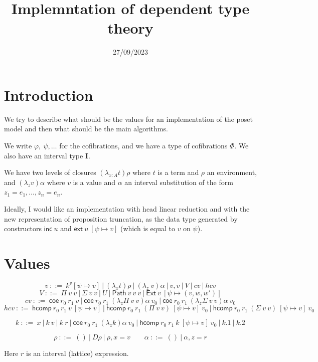 \documentclass[10pt,a4paper]{article}
\newcommand{\II}{\mathbf{I}}
\newcommand{\Path}{\mathsf{Path}}
\newcommand{\Ext}{\mathsf{Ext}}
\newcommand{\ext}{\mathsf{ext}}
\newcommand{\inc}{\mathsf{inc}}
\newcommand{\hcomp}{\mathsf{hcomp}}
\newcommand{\coe}{\mathsf{coe}}
\begin{document}
\title{Implemntation of dependent type theory}

\author{}
\date{27/09/2023}
\maketitle


\section*{Introduction}

We try to describe what should be the values for an implementation of the poset model
and then what should be the main algorithms.

We write $\varphi,~\psi,\dots$ for the cofibrations, and we have a type of cofibrations $\Phi$.
We also have an interval type $\II$.

We have two levels of closures $(\lambda_{x:A}t)\rho$ where $t$ is a term and $\rho$
an environment, and $(\lambda_zv)\alpha$ where $v$ is a value and $\alpha$ an interval
substitution of the form $z_1=e_1,\dots,z_n=e_n$.


\medskip

Ideally, I would like an implementation with head linear reduction and with the new
representation of proposition truncation, as the data type generated by constructors
$\inc~u$ and $\ext~u~[\psi\mapsto v]$ (which is equal to $v$ on $\psi$).



\section*{Values}

$$
v~::=~k^v[\psi\mapsto v]~|~(\lambda_{x}t)\rho~|~(\lambda_z~v)\alpha~|~v,v~|~V~|~cv~|~hcv$$
$$
V~::=~\Pi~v~v~|~\Sigma~v~v~|~U~|~\Path~v~v~v~|~\Ext~v~[\psi\mapsto (v,w,w')]
$$
$$
cv~::=~\coe~r_0~r_1~v~|~
       \coe~r_0~r_1~(\lambda_z\Pi~v~v)\alpha~v_0~|~\coe~r_0~r_1~(\lambda_z\Sigma~v~v)\alpha~v_0
$$
$$
       hcv~::=~\hcomp~r_0~r_1~v~[\psi\mapsto v]~|~
       \hcomp~r_0~r_1~(\Pi~v~v)~[\psi\mapsto v]~v_0~|~\hcomp~r_0~r_1~(\Sigma~v~v)~[\psi\mapsto v]~v_0
$$

$$
k~::=~x~|~k~v~|~k~r~|~\coe~r_0~r_1~(\lambda_zk)\alpha~v_0~|~\hcomp~r_0~r_1~k~[\psi\mapsto v]~v_0~
     |~k.1~|~k.2
$$

$$
\rho~::=~()~|~D\rho~|~\rho,x=v~~~~~~~~~\alpha~::=~()~|~\alpha,z=r
$$

 Here $r$ is an interval (lattice) expression.
\end{document}
